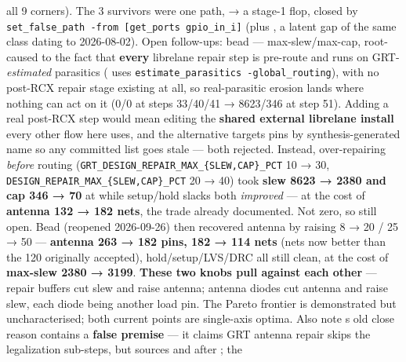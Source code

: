 \begin{record}
\begin{enumerate}
  all 9 corners). The 3 survivors were one path,  →
  a  stage-1 flop, closed by
  \texttt{set\_\allowbreak{}false\_\allowbreak{}path\ -\allowbreak{}from\ [get\_\allowbreak{}ports\ gpio\_\allowbreak{}in\_\allowbreak{}i]}
  (plus , a latent gap of the same class dating to
  2026-08-02). Open follow-ups: bead  ---
  max-slew/\allowbreak{}max-cap, root-caused to the fact that
  \textbf{every} librelane repair step is pre-route and runs on
  GRT-\emph{estimated} parasitics ( uses
  \texttt{estimate\_\allowbreak{}parasitics\ -\allowbreak{}global\_\allowbreak{}routing}),
  with no post-RCX repair stage existing at all, so real-parasitic
  erosion lands where nothing can act on it (0/0 at steps 33/40/41 →
  8623/346 at step 51). Adding a real post-RCX step would mean editing
  the \textbf{shared external librelane install} every other flow here
  uses, and the  alternative targets pins by
  synthesis-generated name so any committed list goes stale --- both
  rejected. Instead, over-repairing \emph{before} routing
  (\texttt{GRT\_\allowbreak{}DESIGN\_\allowbreak{}REPAIR\_\allowbreak{}MAX\_\allowbreak{}\{SLEW,\allowbreak{}CAP\}\_\allowbreak{}PCT}
  10 → 30,
  \texttt{DESIGN\_\allowbreak{}REPAIR\_\allowbreak{}MAX\_\allowbreak{}\{SLEW,\allowbreak{}CAP\}\_\allowbreak{}PCT}
  20 → 40) took \textbf{slew 8623 → 2380 and cap 346 → 70} at
   while setup/\allowbreak{}hold slacks
  both \emph{improved} --- at the cost of \textbf{antenna 132 → 182
  nets}, the trade  already documented. Not
  zero, so still open. Bead  (reopened 2026-09-26) then
  recovered antenna by raising  8 → 20 /
   25 → 50 --- \textbf{antenna 263 → 182 pins,
  182 → 114 nets} (nets now better than the 120  originally
  accepted), hold/\allowbreak{}setup/\allowbreak{}LVS/\allowbreak{}DRC
  all still clean, at the cost of \textbf{max-slew 2380 → 3199}. \warn{}
  \textbf{These two knobs pull against each other} --- repair buffers
  cut slew and raise antenna; antenna diodes cut antenna and raise slew,
  each diode being another load pin. The Pareto frontier is demonstrated
  but uncharacterised; both current points are single-axis optima. Also
  note \textquotesingle s old close reason contains a
  \textbf{false premise} --- it claims GRT antenna repair skips the
  legalization sub-steps, but  sources
   and  after ; the

\end{enumerate}
\end{record}
